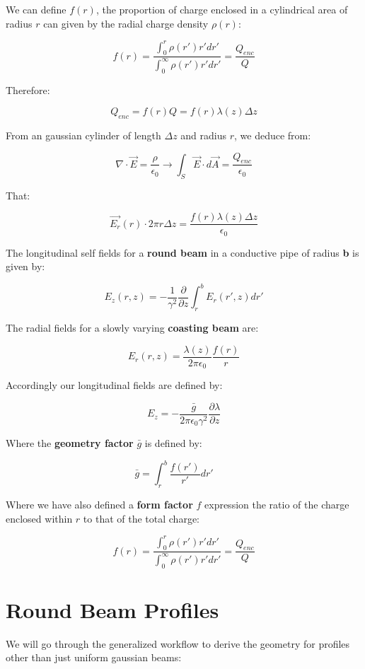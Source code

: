 We can define $f(r)$, the proportion of charge enclosed in a cylindrical area of radius $r$ can given by the radial charge density $\rho(r)$:

$$f(r) =  \frac{\int_0^r \rho(r') r' dr'}{\int_0^\infty \rho(r') r' dr'} = \frac{Q_{enc}}{Q}$$

Therefore:

$$Q_{enc} = f(r) Q = f(r)\lambda(z) \Delta z$$

From an gaussian cylinder of length $\Delta z$ and radius $r$, we deduce from:

$$\nabla \cdot \vec{E} = \frac{\rho}{\epsilon_0} \rightarrow \int_S \vec{E}\cdot d\vec{A} = \frac{Q_{enc}}{\epsilon_0}$$

That:

$$\vec{E_r}(r) \cdot 2\pi r \Delta z = \frac{f(r) \lambda(z)\Delta z}{\epsilon_0}$$

The longitudinal self fields for a \textbf{round beam} in a conductive pipe of radius \textbf{b} is given by:

$$E_z(r, z) = -\frac{1}{\gamma^2}\frac{\partial}{\partial z}\int_r^bE_r(r', z)dr'$$

The radial fields for a slowly varying \textbf{coasting beam} are:

$$E_r(r, z) = \frac{\lambda(z)}{2\pi\epsilon_0}\frac{f(r)}{r}$$

Accordingly our longitudinal fields are defined by:

\begin{equation}
    E_z = -\frac{\bar{g}}{2\pi\epsilon_0\gamma^2}\frac{\partial \lambda}{\partial z}
    \label{eq:longitudinal_self_fields}
\end{equation}

Where the \textbf{geometry factor} $\bar{g}$ is defined by:

$$\bar{g} = \int_r^b\frac{f(r')}{r'}dr' \qquad$$

Where we have also defined a \textbf{form factor} $f$ expression the ratio of the charge enclosed within $r$ to that of the total charge:

\[f(r)= \frac{\int_0^r\rho(r')r'dr'}{\int_0^\infty \rho(r')r'dr'}=\frac{Q_{enc}}{Q}\]

\section{Round Beam Profiles}

We will go through the generalized workflow to derive the geometry for profiles other than just uniform gaussian beams\cite{baartman_form_2015}:


